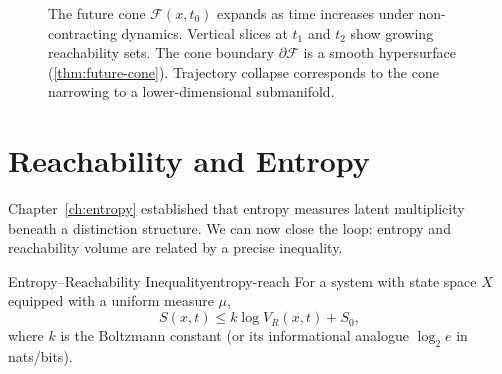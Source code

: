 \documentclass[12pt,twoside,openright]{book}
\begin{document}
\begin{figure}[h]
\centering
{}
\caption{The future cone $\mathcal{F}(x,t_0)$ expands as time
  increases under non-contracting dynamics. Vertical slices
  at $t_1$ and $t_2$ show growing reachability sets. The cone
  boundary $\partial\mathcal{F}$ is a smooth hypersurface
  (\cref{thm:future-cone}). Trajectory collapse corresponds
  to the cone narrowing to a lower-dimensional
  submanifold.}
\label{fig:future-cone}
\end{figure}

\section{Reachability and Entropy}
\label{sec:ch13-entropy}

Chapter~\ref{ch:entropy} established that entropy measures
latent multiplicity beneath a distinction structure. We can
now close the loop: entropy and reachability volume are
related by a precise inequality.

\begin{theorem}{Entropy--Reachability Inequality}{entropy-reach}
  For a system with state space $X$ equipped with a
  uniform measure $\mu$,
  \[
    S(x,t) \le k\log V_R(x,t) + S_0,
  \]
  where $k$ is the Boltzmann constant (or its informational
  analogue $\log_2 e$ in nats/bits).
\end{theorem}
\end{document}

